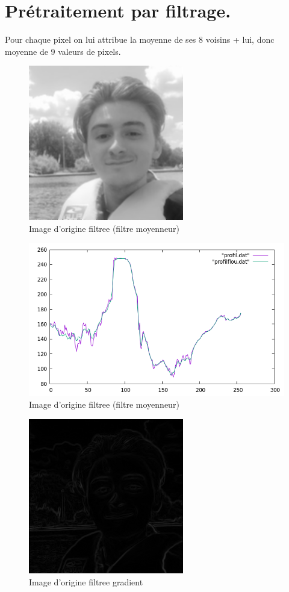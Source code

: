 \documentclass{article}
\begin{document}
\newpage
\section{Prétraitement par filtrage.}
Pour chaque pixel on lui attribue la moyenne  de ses 8 voisins + lui, donc moyenne de 9 valeurs de pixels.
\begin{figure}[h!]
\centerline{\includegraphics[scale=1.]{./rendus/MOIMOIETMOIfiltree.png}}
\caption{Image d'origine filtree (filtre moyenneur)}
\end{figure}

\begin{figure}[h!]
\centerline{\includegraphics[scale=0.6]{./rendus/profilOriginalEtFloutee.png}}
\caption{Image d'origine filtree (filtre moyenneur)}
\end{figure}

\begin{figure}[h!]
\centerline{\includegraphics[scale=1.]{./rendus/MOIMOIETMOIfiltreegradient.png}}
\caption{Image d'origine filtree gradient}
\end{figure}
\end{document}
